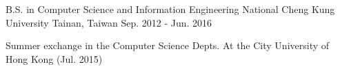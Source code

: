 

\begin{cventries}

  \cventry
    {B.S. in Computer Science and Information Engineering} %
    {National Cheng Kung University} %
    {Tainan, Taiwan} %
    {Sep. 2012 - Jun. 2016} %
    {
      \begin{cvitems} %
        \item {Summer exchange in the Computer Science Depts. At the City University of Hong Kong (Jul. 2015)}
      \end{cvitems}
    }

\end{cventries}
